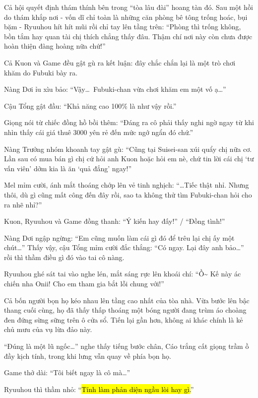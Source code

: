 \documentclass[../main.tex]{subfiles}
\begin{document}
Cả hội quyết định thám thính bên trong ``tòa lâu đài'' hoang tàn đó. Sau một hồi do thám khắp nơi - vốn dĩ chỉ toàn là những căn phòng bê tông trống hoác, bụi bặm - Ryuuhou hít hít mũi rồi chỉ tay lên tầng trên: ``Phòng thì trống không, bồn tắm hay quan tài chị thích chẳng thấy đâu. Thậm chí nơi này còn chưa được hoàn thiện đàng hoàng nữa chứ!''

Cả Kuon và Game đều gật gù ra kết luận: đây chắc chắn lại là một trò chơi khăm do Fubuki bày ra.

Nàng Dơi ỉu xìu bảo: ``Vậy\dots\ Fubuki-chan vừa chơi khăm em một vố ạ\dots''

Cậu Tổng gật đầu: ``Khả năng cao 100\% là như vậy rồi.''

Giọng nói từ chiếc đồng hồ bồi thêm: ``Đáng ra cô phải thấy nghi ngờ ngay từ khi nhìn thấy cái giá thuê 3000 yên rẻ đến mức ngớ ngẩn đó chứ.''

Nàng Trưởng nhóm khoanh tay gật gù: ``Cũng tại Suisei-san xúi quẩy chị nữa cơ. Lần sau có mua bán gì chị cứ hỏi anh Kuon hoặc hỏi em nè, chứ tin lời cái chị `tư vấn viên' dởm kia là ăn `quả đắng' ngay!''

Mel mỉm cười, ánh mắt thoáng chớp lên vẻ tinh nghịch: ``\dots Tiếc thật nhỉ. Nhưng thôi, dù gì cũng mất công đến đây rồi, sao ta không thử tìm Fubuki-chan hỏi cho ra nhẽ nhỉ?''

Kuon, Ryuuhou và Game đồng thanh: ``Ý kiến hay đấy!'' / ``Đồng tình!''

Nàng Dơi ngập ngừng: ``Em cũng muốn làm cái gì đó để trêu lại chị ấy một chút\dots'' Thấy vậy, cậu Tổng mỉm cười đắc thắng: ``Có ngay. Lại đây anh bảo\dots'' rồi thì thầm điều gì đó vào tai cô nàng.

Ryuuhou ghé sát tai vào nghe lén, mắt sáng rực lên khoái chí: ``Ồ\~{} Kế này ác chiến nha Onii! Cho em tham gia bắt lỗi chung với!''

\ct

Cả bốn người bọn họ kéo nhau lên tầng cao nhất của tòa nhà. Vừa bước lên bậc thang cuối cùng, họ đã thấy thấp thoáng một bóng người đang trùm áo choàng đen đứng sừng sững trên ô cửa sổ. Tiến lại gần hơn, không ai khác chính là kẻ chủ mưu của vụ lừa đảo này.

``Đúng là một lũ ngốc\dots'' nghe thấy tiếng bước chân, Cáo trắng cất giọng trầm ồ đầy kịch tính, trong khi lưng vẫn quay về phía bọn họ.

Game thở dài: ``Tôi biết ngay là cô mà\dots''

Ryuuhou thì thầm nhỏ: ``\hl{Tính làm phản diện ngầu lòi hay gì.}''
\end{document}
